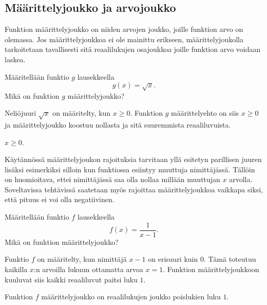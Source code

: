 \subsection*{Määrittelyjoukko ja arvojoukko}


Funktion määrittelyjoukko on niiden arvojen joukko, joille funktion arvo on olemassa. Jos määrittelyjoukkoa ei ole mainittu erikseen, määrittelyjoukolla tarkoitetaan tavallisesti sitä reaalilukujen osajoukkoa joille funktion arvo voidaan laskea. %

\begin{esimerkki}
	 Määritellään funktio $g$ lausekkeella \[ g(x) = \sqrt{x}. \]
	 Mikä on funktion $g$ määrittelyjoukko?
	 \begin{esimratk}
		Neliöjuuri $\sqrt{x}$ on määritelty, kun $x\geq{0}$. Funktion $g$ määrittelyehto on siis $x\geq{0}$ ja määrittelyjoukko koostuu nollasta ja sitä suuremmista reaaliluvuista.
	 \end{esimratk}
	 \begin{esimvast}
	  $x\geq{0}$.
	 \end{esimvast}
\end{esimerkki}

Käytännössä määrittelyjoukon rajoituksia tarvitaan yllä esitetyn parillisen juuren lisäksi esimerkiksi silloin kun funktiossa esiintyy muuttuja nimittäjässä.
Tällöin on huomioitava, ettei nimittäjässä saa olla nollaa millään muuttujan $x$ arvolla. 
Soveltavissa tehtävissä saatetaan myös rajoittaa määrittelyjoukkoa vaikkapa siksi, että pituus ei voi olla negatiivinen.

\begin{esimerkki}
	Määritellään funktio $f$ lausekkeella \[ f(x) = \frac{1}{x-1}. \]
	Mikä on funktion määrittelyjoukko?
	\begin{esimratk}
		Funktio $f$ on määritelty, kun nimittäjä $x-1$ on erisuuri kuin 0.
		Tämä toteutuu kaikilla $x$:n arvoilla lukuun ottamatta arvoa $x = 1$.
		Funktion määrittelyjoukkoon kuuluvat siis kaikki reaaliluvut paitsi luku $1$.
	\end{esimratk}
	\begin{esimvast}
		Funktion $f$ määrittelyjoukko on reaalilukujen joukko poislukien luku $1$.
	\end{esimvast}
\end{esimerkki}


